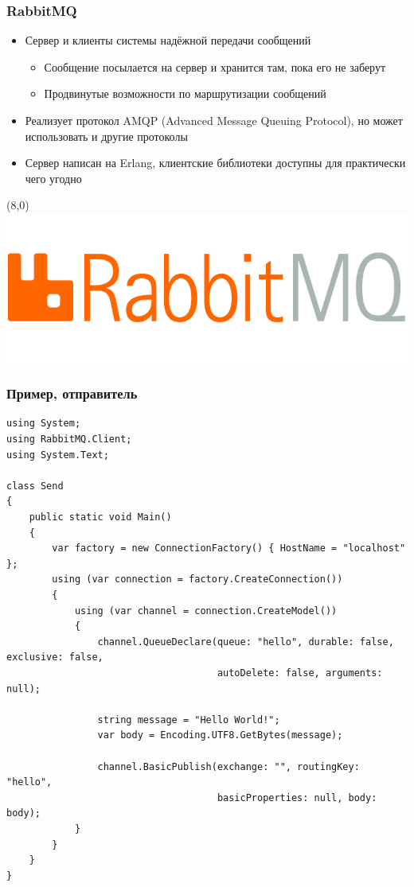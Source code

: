 \documentclass[xetex,mathserif,serif]{beamer}
\begin{document}
    \begin{frame}
        \frametitle{RabbitMQ}
        \begin{itemize}
            \item Сервер и клиенты системы надёжной передачи сообщений
            \begin{itemize}
                \item Сообщение посылается на сервер и хранится там, пока его не заберут
                \item Продвинутые возможности по маршрутизации сообщений
            \end{itemize}
            \item Реализует протокол AMQP (Advanced Message Queuing Protocol), но может использовать и другие протоколы
            \item Сервер написан на Erlang, клиентские библиотеки доступны для практически чего угодно
        \end{itemize}
        \begin{textblock}{3}(8,0)
            \includegraphics[width=\textwidth]{rabbitmqLogo.png}
        \end{textblock}
    \end{frame}

    \begin{frame}[fragile]
        \frametitle{Пример, отправитель}
        \begin{ssmall}
            \begin{verbatim}
using System;
using RabbitMQ.Client;
using System.Text;

class Send
{
    public static void Main()
    {
        var factory = new ConnectionFactory() { HostName = "localhost" };
        using (var connection = factory.CreateConnection())
        {
            using (var channel = connection.CreateModel())
            {
                channel.QueueDeclare(queue: "hello", durable: false, exclusive: false,
                                     autoDelete: false, arguments: null);

                string message = "Hello World!";
                var body = Encoding.UTF8.GetBytes(message);

                channel.BasicPublish(exchange: "", routingKey: "hello",
                                     basicProperties: null, body: body);
            }
        }
    }
}
            \end{verbatim}
        \end{ssmall}
    \end{frame}
\end{document}
